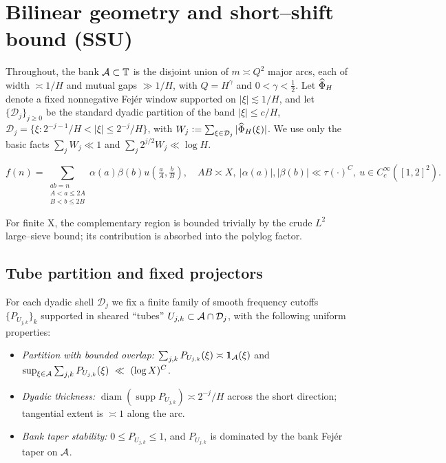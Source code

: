 \section{Bilinear geometry and short–shift bound (SSU)}\label{sec:ssu}

Throughout, the bank $\mathcal{A}\subset\mathbb T$ is the disjoint union of $m\asymp Q^2$ major arcs,
each of width $\asymp 1/H$ and mutual gaps $\gg 1/H$, with $Q=H^\gamma$ and $0<\gamma<\tfrac12$.
Let $\widehat\Phi_H$ denote a fixed nonnegative Fejér window supported on $|\xi|\lesssim 1/H$, and let
$\{\mathcal D_j\}_{j\ge 0}$ be the standard dyadic partition of the band $|\xi|\le c/H$,
$\mathcal D_j=\{\xi:2^{-j-1}/H<|\xi|\le 2^{-j}/H\}$, with $W_j:=\sum_{\xi\in\mathcal D_j}|\widehat\Phi_H(\xi)|$.
We use only the basic facts $\sum_j W_j\ll 1$ and $\sum_j 2^{j/2}W_j\ll \log H$.

\begin{definition}[Admissible F3]\label{def:F3}
\[
f(n)=\sum_{\substack{ab=n\\A<a\le2A\\B<b\le2B}}\alpha(a)\beta(b)u(\tfrac{a}{A},\tfrac{b}{B}),\quad AB\asymp X,\ 
|\alpha(a)|,|\beta(b)|\ll\tau(\cdot)^C,\ u\in C_c^\infty([1,2]^2).\]
\end{definition}

For finite X, the complementary region is bounded trivially by the crude $L^2$ large–sieve bound; its contribution is absorbed into the polylog factor.

\subsection{Tube partition and fixed projectors}
For each dyadic shell $\mathcal D_j$ we fix a finite family of smooth frequency cutoffs
$\{P_{U_{j,k}}\}_k$ supported in sheared ``tubes'' $U_{j,k}\subset\mathcal{A}\cap\mathcal D_j$, with the
following uniform properties:

\begin{itemize}
\item[(T1)] \emph{Partition with bounded overlap:} $\sum_{j,k} P_{U_{j,k}}(\xi)\asymp \mathbf 1_{\mathcal{A}}(\xi)$ and
$\sup_{\xi\in\cA}\sum_{j,k} P_{U_{j,k}}(\xi)\ \ll\ (\log X)^C$.
\item[(T2)] \emph{Dyadic thickness:} $\operatorname{diam}(\operatorname{supp} P_{U_{j,k}})\asymp 2^{-j}/H$ across the short direction; tangential extent is $\asymp 1$ along the arc.
\item[(T3)] \emph{Bank taper stability:} $0\le P_{U_{j,k}}\le 1$, and $P_{U_{j,k}}$ is dominated by the bank Fejér taper on $\mathcal{A}$.
\end{itemize}

